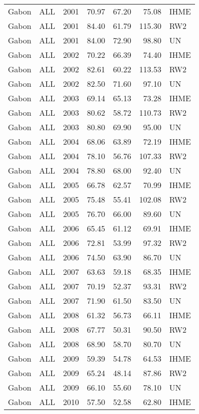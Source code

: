 \begin{longtable}{lllrrrl}
  Gabon & ALL & 2001 & 70.97 & 67.20 & 75.08 & IHME \\ 
  Gabon & ALL & 2001 & 84.40 & 61.79 & 115.30 & RW2 \\ 
  Gabon & ALL & 2001 & 84.00 & 72.90 & 98.80 & UN \\ 
  Gabon & ALL & 2002 & 70.22 & 66.39 & 74.40 & IHME \\ 
  Gabon & ALL & 2002 & 82.61 & 60.22 & 113.53 & RW2 \\ 
  Gabon & ALL & 2002 & 82.50 & 71.60 & 97.10 & UN \\ 
  Gabon & ALL & 2003 & 69.14 & 65.13 & 73.28 & IHME \\ 
  Gabon & ALL & 2003 & 80.62 & 58.72 & 110.73 & RW2 \\ 
  Gabon & ALL & 2003 & 80.80 & 69.90 & 95.00 & UN \\ 
  Gabon & ALL & 2004 & 68.06 & 63.89 & 72.19 & IHME \\ 
  Gabon & ALL & 2004 & 78.10 & 56.76 & 107.33 & RW2 \\ 
  Gabon & ALL & 2004 & 78.80 & 68.00 & 92.40 & UN \\ 
  Gabon & ALL & 2005 & 66.78 & 62.57 & 70.99 & IHME \\ 
  Gabon & ALL & 2005 & 75.48 & 55.41 & 102.08 & RW2 \\ 
  Gabon & ALL & 2005 & 76.70 & 66.00 & 89.60 & UN \\ 
  Gabon & ALL & 2006 & 65.45 & 61.12 & 69.91 & IHME \\ 
  Gabon & ALL & 2006 & 72.81 & 53.99 & 97.32 & RW2 \\ 
  Gabon & ALL & 2006 & 74.50 & 63.90 & 86.70 & UN \\ 
  Gabon & ALL & 2007 & 63.63 & 59.18 & 68.35 & IHME \\ 
  Gabon & ALL & 2007 & 70.19 & 52.37 & 93.31 & RW2 \\ 
  Gabon & ALL & 2007 & 71.90 & 61.50 & 83.50 & UN \\ 
  Gabon & ALL & 2008 & 61.32 & 56.73 & 66.11 & IHME \\ 
  Gabon & ALL & 2008 & 67.77 & 50.31 & 90.50 & RW2 \\ 
  Gabon & ALL & 2008 & 68.90 & 58.70 & 80.70 & UN \\ 
  Gabon & ALL & 2009 & 59.39 & 54.78 & 64.53 & IHME \\ 
  Gabon & ALL & 2009 & 65.24 & 48.14 & 87.86 & RW2 \\ 
  Gabon & ALL & 2009 & 66.10 & 55.60 & 78.10 & UN \\ 
  Gabon & ALL & 2010 & 57.50 & 52.58 & 62.80 & IHME \\ 

\end{longtable}
